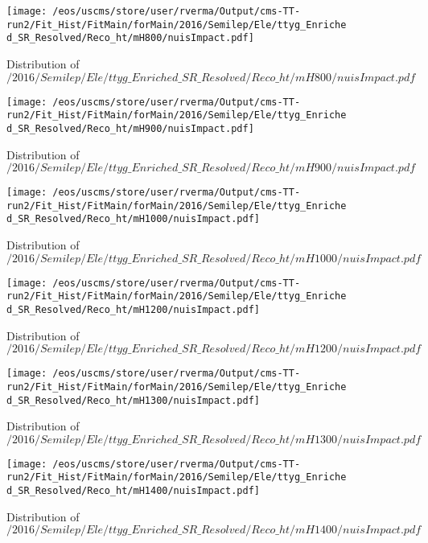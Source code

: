 \begin{figure}
\centering
\texttt{[image: /eos/uscms/store/user/rverma/Output/cms-TT-run2/Fit\_Hist/FitMain/forMain/2016/Semilep/Ele/ttyg\_Enriched\_SR\_Resolved/Reco\_ht/mH800/nuisImpact.pdf]}
\caption{Distribution of $/2016/Semilep/Ele/ttyg\_Enriched\_SR\_Resolved/Reco\_ht/mH800/nuisImpact.pdf$}
\end{figure}

\begin{figure}
\centering
\texttt{[image: /eos/uscms/store/user/rverma/Output/cms-TT-run2/Fit\_Hist/FitMain/forMain/2016/Semilep/Ele/ttyg\_Enriched\_SR\_Resolved/Reco\_ht/mH900/nuisImpact.pdf]}
\caption{Distribution of $/2016/Semilep/Ele/ttyg\_Enriched\_SR\_Resolved/Reco\_ht/mH900/nuisImpact.pdf$}
\end{figure}

\begin{figure}
\centering
\texttt{[image: /eos/uscms/store/user/rverma/Output/cms-TT-run2/Fit\_Hist/FitMain/forMain/2016/Semilep/Ele/ttyg\_Enriched\_SR\_Resolved/Reco\_ht/mH1000/nuisImpact.pdf]}
\caption{Distribution of $/2016/Semilep/Ele/ttyg\_Enriched\_SR\_Resolved/Reco\_ht/mH1000/nuisImpact.pdf$}
\end{figure}

\begin{figure}
\centering
\texttt{[image: /eos/uscms/store/user/rverma/Output/cms-TT-run2/Fit\_Hist/FitMain/forMain/2016/Semilep/Ele/ttyg\_Enriched\_SR\_Resolved/Reco\_ht/mH1200/nuisImpact.pdf]}
\caption{Distribution of $/2016/Semilep/Ele/ttyg\_Enriched\_SR\_Resolved/Reco\_ht/mH1200/nuisImpact.pdf$}
\end{figure}

\begin{figure}
\centering
\texttt{[image: /eos/uscms/store/user/rverma/Output/cms-TT-run2/Fit\_Hist/FitMain/forMain/2016/Semilep/Ele/ttyg\_Enriched\_SR\_Resolved/Reco\_ht/mH1300/nuisImpact.pdf]}
\caption{Distribution of $/2016/Semilep/Ele/ttyg\_Enriched\_SR\_Resolved/Reco\_ht/mH1300/nuisImpact.pdf$}
\end{figure}

\begin{figure}
\centering
\texttt{[image: /eos/uscms/store/user/rverma/Output/cms-TT-run2/Fit\_Hist/FitMain/forMain/2016/Semilep/Ele/ttyg\_Enriched\_SR\_Resolved/Reco\_ht/mH1400/nuisImpact.pdf]}
\caption{Distribution of $/2016/Semilep/Ele/ttyg\_Enriched\_SR\_Resolved/Reco\_ht/mH1400/nuisImpact.pdf$}
\end{figure}

